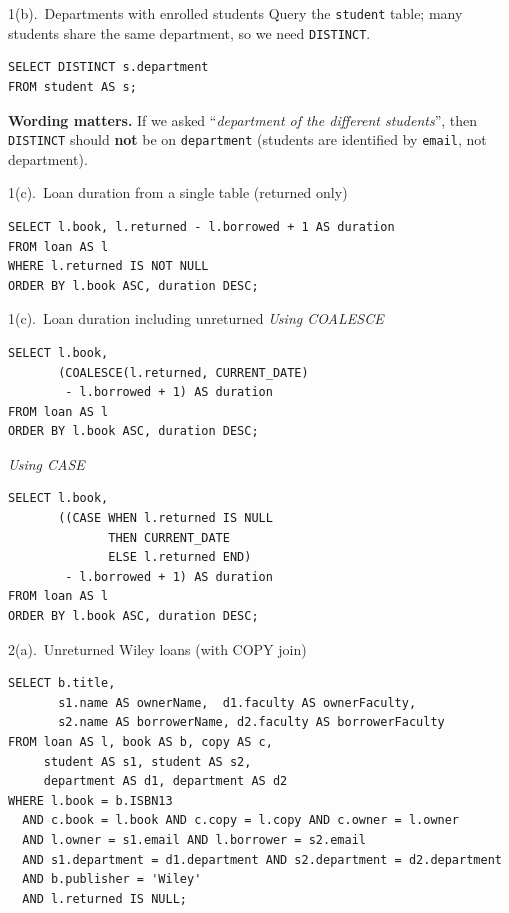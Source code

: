 \documentclass{beamer}
\begin{document}
\begin{frame}[fragile]{1(b).\ Departments with enrolled students}
\small
Query the \texttt{student} table; many students share the same department, so we need \texttt{DISTINCT}.
\begin{lstlisting}
SELECT DISTINCT s.department
FROM student AS s;
\end{lstlisting}
\textbf{Wording matters.} If we asked “\emph{department of the different students}”, then \texttt{DISTINCT} should \textbf{not} be on \texttt{department} (students are identified by \texttt{email}, not department).
\end{frame}

\begin{frame}[fragile]{1(c).\ Loan duration from a single table (returned only)}
\small
\begin{lstlisting}[style=sqlcompact]  % compact style avoids wrapping/overflow
SELECT l.book, l.returned - l.borrowed + 1 AS duration
FROM loan AS l
WHERE l.returned IS NOT NULL
ORDER BY l.book ASC, duration DESC;
\end{lstlisting}
\end{frame}

\begin{frame}[fragile]{1(c).\ Loan duration including unreturned}
\small\itshape Using COALESCE
\begin{lstlisting}[style=sqlcompact]
SELECT l.book,
       (COALESCE(l.returned, CURRENT_DATE)
        - l.borrowed + 1) AS duration
FROM loan AS l
ORDER BY l.book ASC, duration DESC;
\end{lstlisting}

\medskip\itshape Using CASE
\begin{lstlisting}[style=sqlcompact]
SELECT l.book,
       ((CASE WHEN l.returned IS NULL
              THEN CURRENT_DATE
              ELSE l.returned END)
        - l.borrowed + 1) AS duration
FROM loan AS l
ORDER BY l.book ASC, duration DESC;
\end{lstlisting}
\end{frame}

\begin{frame}[fragile]{2(a).\ Unreturned Wiley loans (with COPY join)}
\small
\begin{lstlisting}[style=sqlcompact]
SELECT b.title,
       s1.name AS ownerName,  d1.faculty AS ownerFaculty,
       s2.name AS borrowerName, d2.faculty AS borrowerFaculty
FROM loan AS l, book AS b, copy AS c,
     student AS s1, student AS s2,
     department AS d1, department AS d2
WHERE l.book = b.ISBN13
  AND c.book = l.book AND c.copy = l.copy AND c.owner = l.owner
  AND l.owner = s1.email AND l.borrower = s2.email
  AND s1.department = d1.department AND s2.department = d2.department
  AND b.publisher = 'Wiley'
  AND l.returned IS NULL;
\end{lstlisting}
\end{frame}
\end{document}
